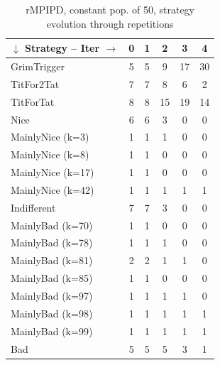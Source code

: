 \documentclass[journal,a4paper,10pt,twoside]{IEEEtran} %
\begin{document}
\begin{table}[ht]
	\caption{rMPIPD, constant pop. of 50, strategy evolution through repetitions}
	\label{tab:ripdmp-const}
	\centering
    \begin{tabular}{l|ccccc} \toprule
    	$\downarrow$ Strategy -- Iter $\rightarrow$  & 0 & 1 & 2 & 3 & 4 \\ \midrule
    	GrimTrigger       &  5 &  5 &   9 &  17 &  30 \\
    	TitFor2Tat        &  7 &  7 &   8 &   6 &   2 \\
    	TitForTat         &  8 &  8 &  15 &  19 &  14 \\
    	Nice              &  6 &  6 &   3 &   0 &   0 \\
    	MainlyNice (k=3)  &  1 &  1 &   1 &   0 &   0 \\
    	MainlyNice (k=8)  &  1 &  1 &   0 &   0 &   0 \\
    	MainlyNice (k=17) &  1 &  1 &   0 &   0 &   0 \\
    	MainlyNice (k=42) &  1 &  1 &   1 &   1 &   1 \\
    	Indifferent       &  7 &  7 &   3 &   0 &   0 \\
    	MainlyBad (k=70)  &  1 &  1 &   0 &   0 &   0 \\
    	MainlyBad (k=78)  &  1 &  1 &   1 &   0 &   0 \\
    	MainlyBad (k=81)  &  2 &  2 &   1 &   1 &   0 \\
    	MainlyBad (k=85)  &  1 &  1 &   0 &   0 &   0 \\
    	MainlyBad (k=97)  &  1 &  1 &   1 &   1 &   0 \\
    	MainlyBad (k=98)  &  1 &  1 &   1 &   1 &   1 \\
    	MainlyBad (k=99)  &  1 &  1 &   1 &   1 &   1 \\
    	Bad               &  5 &  5 &   5 &   3 &   1 \\ \bottomrule
    \end{tabular}
\end{table}
\end{document}
